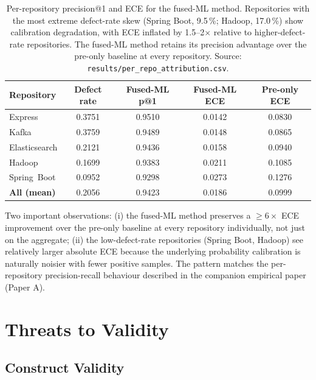 \documentclass[conference]{IEEEtran}
\begin{document}
\begin{table}[!ht]
\centering
\caption{Per-repository precision@1 and ECE for the fused-ML method.
Repositories with the most extreme defect-rate skew (Spring Boot,
9.5\,\%; Hadoop, 17.0\,\%) show calibration degradation, with ECE
inflated by 1.5--2$\times$ relative to higher-defect-rate
repositories. The fused-ML method retains its precision advantage
over the pre-only baseline at every repository.
Source: \texttt{results/per\_repo\_attribution.csv}.}
\label{tab:per_repo_attr}
\small
\begin{tabular}{lcccc}
\toprule
Repository          & Defect rate & Fused-ML p@1 & Fused-ML ECE & Pre-only ECE \\
\midrule
Express             & 0.3751 & 0.9510 & 0.0142 & 0.0830 \\
Kafka               & 0.3759 & 0.9489 & 0.0148 & 0.0865 \\
Elasticsearch       & 0.2121 & 0.9436 & 0.0158 & 0.0940 \\
Hadoop              & 0.1699 & 0.9383 & 0.0211 & 0.1085 \\
Spring~Boot         & 0.0952 & 0.9298 & 0.0273 & 0.1276 \\
\midrule
\textbf{All (mean)} & 0.2056 & 0.9423 & 0.0186 & 0.0999 \\
\bottomrule
\end{tabular}
\end{table}

Two important observations: (i) the fused-ML method preserves a
$\geq 6\times$ ECE improvement over the pre-only baseline at every
repository individually, not just on the aggregate; (ii) the
low-defect-rate repositories (Spring Boot, Hadoop) see relatively
larger absolute ECE because the underlying probability calibration
is naturally noisier with fewer positive samples. The pattern
matches the per-repository precision-recall behaviour described in
the companion empirical paper (Paper A).

\section{Threats to Validity}
\label{sec:threats}
\FloatBarrier

\subsection{Construct Validity}
\end{document}
